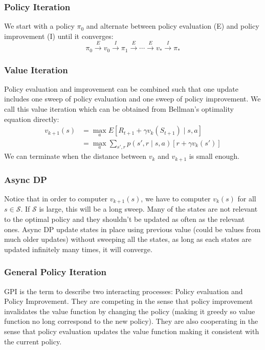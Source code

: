 \documentclass[twocolumn, 10pt]{article}
\newcommand{\stateset}{\mathcal{S}}
\begin{document}
\subsubsection*{Policy Iteration}
We start with a policy $\pi_0$ and alternate between policy evaluation (E) and policy improvement (I) until it converges:
$$ \pi_0 \overset{E}{\rightarrow} v_0 \overset{I}{\rightarrow} \pi_1 \overset{E}{\rightarrow} \cdots \overset{E}{\rightarrow} v_* \overset{I}{\rightarrow} \pi_* $$
 
 \subsubsection*{Value Iteration}
 Policy evaluation and improvement can  be combined such that one update includes one sweep of policy evaluation and one sweep of policy improvement. We call this value iteration which can be obtained from Bellman's optimality equation directly:
 $$
 \begin{aligned}
 v_{k+1}(s) &= \max_{a} E[R_{t+1} + \gamma v_{k}(S_{t+1}) \mid s, a] \\
                     &= \max_{a} \sum_{s' , r} p(s', r \mid s, a) [r + \gamma v_{k}(s')]
 \end{aligned}
 $$
 We can terminate when the distance between $v_k$ and $v_{k+1}$ is small enough.
 
 \subsubsection*{Async DP}
 Notice that in order to computer $v_{k+1}(s)$, we have to computer $v_k(s)$ for all $s \in \stateset$. If $\stateset$ is large, this will be a long sweep. Many of the states are not relevant to the optimal policy and they shouldn't be updated as often as the relevant ones. Async DP update states in place using previous value (could be values from much older updates) without sweeping all the states, as long as each states are updated infinitely many times, it will converge. 
 
 \subsubsection*{General Policy Iteration}
 GPI is the term to describe two interacting processes: Policy evaluation and Policy Improvement. They are competing in the sense that policy improvement invalidates the value function by changing the policy (making it greedy so value function no long correspond to the new policy). They are also cooperating in the sense that policy evaluation updates the value function making it consistent with the current policy.
 
\end{document}
